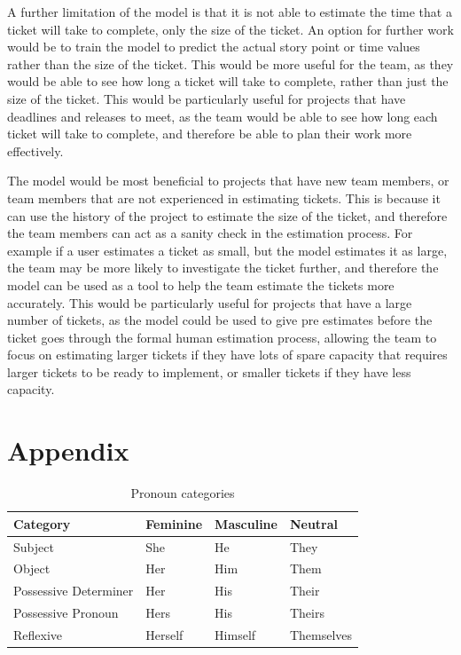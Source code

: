 \documentclass{UoYCSproject}
\begin{document}
    A further limitation of the model is that it is not able to estimate the time that a ticket will take to complete, only the size of the ticket. An option for further work would be to train the model to predict the actual story point or time values rather than the size of the ticket. This would be more useful for the team, as they would be able to see how long a ticket will take to complete, rather than just the size of the ticket. This would be particularly useful for projects that have deadlines and releases to meet, as the team would be able to see how long each ticket will take to complete, and therefore be able to plan their work more effectively.

    The model would be most beneficial to projects that have new team members, or team members that are not experienced in estimating tickets. This is because it can use the history of the project to estimate the size of the ticket, and therefore the team members can act as a sanity check in the estimation process. For example if a user estimates a ticket as small, but the model estimates it as large, the team may be more likely to investigate the ticket further, and therefore the model can be used as a tool to help the team estimate the tickets more accurately. This would be particularly useful for projects that have a large number of tickets, as the model could be used to give pre estimates before the ticket goes through the formal human estimation process, allowing the team to focus on estimating larger tickets if they have lots of spare capacity that requires larger tickets to be ready to implement, or smaller tickets if they have less capacity.





\appendix
\chapter{Appendix}\label{ch:appendix}

\begin{table}[!ht]
\centering
\begin{tabular}{llll}
\toprule
Category & Feminine & Masculine & Neutral \\
\midrule
Subject & She & He & They \\
Object & Her & Him & Them \\
Possessive Determiner & Her & His & Their \\
Possessive Pronoun & Hers & His & Theirs \\
Reflexive & Herself & Himself & Themselves \\
\bottomrule
\end{tabular}
\caption{Pronoun categories \cite{rarrick2023evaluating}}
\label{tab:pronoun_cats}
\end{table}



\printbibliography
\end{document}
